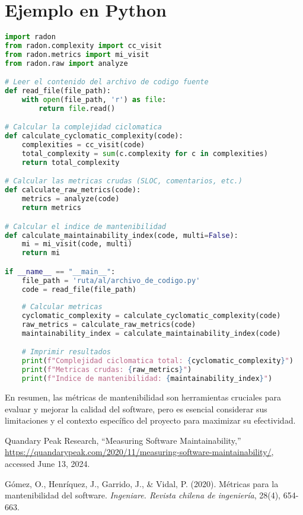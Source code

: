\documentclass{article}
\begin{document}
\section{Ejemplo en Python}
\begin{lstlisting}[language=Python, caption=Script para calcular métricas de mantenibilidad de software]
import radon
from radon.complexity import cc_visit
from radon.metrics import mi_visit
from radon.raw import analyze

# Leer el contenido del archivo de codigo fuente
def read_file(file_path):
    with open(file_path, 'r') as file:
        return file.read()

# Calcular la complejidad ciclomatica
def calculate_cyclomatic_complexity(code):
    complexities = cc_visit(code)
    total_complexity = sum(c.complexity for c in complexities)
    return total_complexity

# Calcular las metricas crudas (SLOC, comentarios, etc.)
def calculate_raw_metrics(code):
    metrics = analyze(code)
    return metrics

# Calcular el indice de mantenibilidad
def calculate_maintainability_index(code, multi=False):
    mi = mi_visit(code, multi)
    return mi

if __name__ == "__main__":
    file_path = 'ruta/al/archivo_de_codigo.py'
    code = read_file(file_path)
    
    # Calcular metricas
    cyclomatic_complexity = calculate_cyclomatic_complexity(code)
    raw_metrics = calculate_raw_metrics(code)
    maintainability_index = calculate_maintainability_index(code)

    # Imprimir resultados
    print(f"Complejidad ciclomatica total: {cyclomatic_complexity}")
    print(f"Metricas crudas: {raw_metrics}")
    print(f"Indice de mantenibilidad: {maintainability_index}")
\end{lstlisting}

En resumen, las métricas de mantenibilidad son herramientas cruciales para evaluar y mejorar la calidad del software, pero es esencial considerar sus limitaciones y el contexto específico del proyecto para maximizar su efectividad.




\begin{thebibliography}{1}
Quandary Peak Research, ``Measuring Software Maintainability,'' \url{https://quandarypeak.com/2020/11/measuring-software-maintainability/}, accessed June 13, 2024.

Gómez, O., Henríquez, J., Garrido, J., \& Vidal, P. (2020). Métricas para la mantenibilidad del software. \textit{Ingeniare. Revista chilena de ingeniería}, 28(4), 654-663.


\end{thebibliography}
\end{document}
